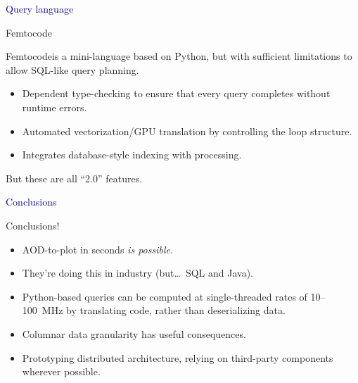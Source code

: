 \documentclass{beamer}
\begin{document}
\begin{frame}
\begin{center}
\huge \textcolor{darkblue}{Query language}
\end{center}
\end{frame}

\begin{frame}{Femtocode}
\vspace{0.5 cm}

Femtocode\footnotemark[1] is a mini-language based on Python, but with sufficient limitations to allow SQL-like query planning.

\vspace{0.25 cm}
\begin{itemize}\setlength{\itemsep}{0.25 cm}
\item Dependent type-checking to ensure that every query completes without runtime errors.
\item Automated vectorization/GPU translation by controlling the loop structure.
\item Integrates database-style indexing with processing.
\end{itemize}

\vspace{0.25 cm}
But these are all ``2.0'' features.

\end{frame}

\begin{frame}
\begin{center}
\huge \textcolor{darkblue}{Conclusions}
\end{center}
\end{frame}

\begin{frame}{Conclusions!}
\vspace{0.5 cm}

\begin{itemize}\setlength{\itemsep}{0.5 cm}
\item AOD-to-plot in seconds {\it is possible.}
\item They're doing this in industry (but\ldots\ SQL and Java).
\item Python-based queries can be computed at single-threaded rates of 10--100~MHz by translating code, rather than deserializing data.
\item Columnar data granularity has useful consequences.
\item Prototyping distributed architecture, relying on third-party components wherever possible.
\end{itemize}
\end{frame}
\end{document}
